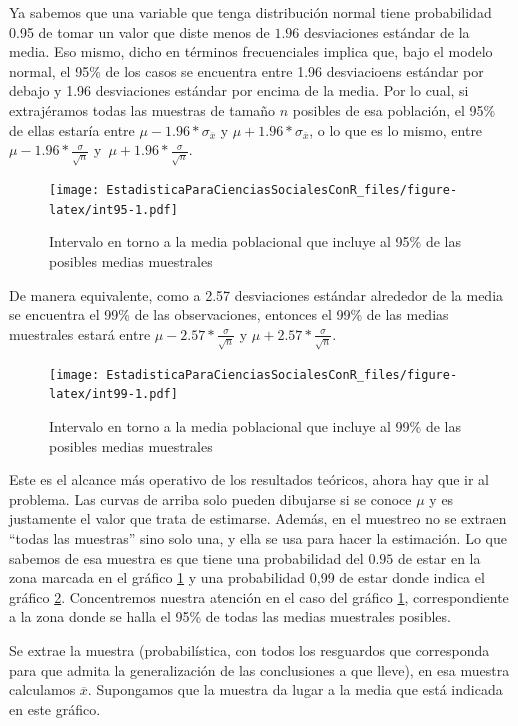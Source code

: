 \documentclass[]{book}
\begin{document}
Ya sabemos que una variable que tenga distribución normal tiene probabilidad 0.95 de tomar un valor que diste menos de \(1.96\) desviaciones estándar de la media. Eso mismo, dicho en términos frecuenciales implica que, bajo el modelo normal, el 95\% de los casos se encuentra entre 1.96 desviacioens estándar por debajo y 1.96 desviaciones estándar por encima de la media. Por lo cual, si extrajéramos todas las muestras de tamaño \(n\) posibles de esa población, el 95\% de ellas estaría entre \(\mu - 1.96*\sigma_{\overline{x}}\) y \(\mu + 1.96*\sigma_{\overline{x}}\), o lo que es lo mismo, entre \(\mu - 1.96*\frac{\sigma}{\sqrt{n}}\) y~\(\mu + 1.96*\frac{\sigma}{\sqrt{n}}\).

\begin{figure}
\centering
\texttt{[image: EstadisticaParaCienciasSocialesConR\_files/figure-latex/int95-1.pdf]}
\caption{\label{fig:int95}Intervalo en torno a la media poblacional que incluye al 95\% de las posibles medias muestrales}
\end{figure}

De manera equivalente, como a 2.57 desviaciones estándar alrededor de la
media se encuentra el 99\% de las observaciones, entonces el 99\% de las
medias muestrales estará entre
\(\mu - 2.57*\frac{\sigma}{\sqrt{n}}\) y \(\mu + 2.57*\frac{\sigma}{\sqrt{n}}\).

\begin{figure}
\centering
\texttt{[image: EstadisticaParaCienciasSocialesConR\_files/figure-latex/int99-1.pdf]}
\caption{\label{fig:int99}Intervalo en torno a la media poblacional que incluye al 99\% de las posibles medias muestrales}
\end{figure}

Este es el alcance más operativo de los resultados teóricos, ahora hay
que ir al problema. Las curvas de arriba solo pueden dibujarse si se
conoce \(\mu\) y es justamente el valor que trata de estimarse. Además, en
el muestreo no se extraen ``todas las muestras'' sino solo una, y ella se
usa para hacer la estimación. Lo que sabemos de esa muestra es que tiene
una probabilidad del \(0.95\) de estar en la zona marcada en el gráfico \ref{fig:int95} y una probabilidad 0,99 de estar donde indica el gráfico \ref{fig:int99}. Concentremos nuestra atención en el caso del gráfico \ref{fig:int95}, correspondiente a la zona donde se halla el 95\% de todas las medias muestrales posibles.

Se extrae la muestra (probabilística, con todos los resguardos que
corresponda para que admita la generalización de las conclusiones a que
lleve), en esa muestra calculamos \(\overline{x}\). Supongamos que la
muestra da lugar a la media que está indicada en este gráfico.
\end{document}
